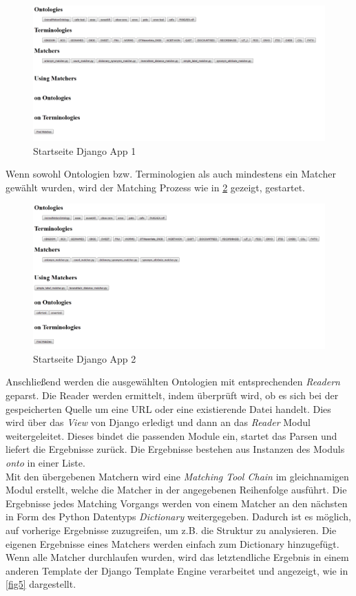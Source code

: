 		\begin{figure}[ht]
		\centering
		\includegraphics[width=1.0\textwidth]{pics/TemplateMatchingStartPage.png}
		\caption{Startseite Django App 1}
		\label{fig3}
		\end{figure}
		Wenn sowohl Ontologien bzw. Terminologien als auch mindestens ein Matcher
		gewählt wurden, wird der Matching Prozess wie in \ref{fig4} gezeigt,
		gestartet.
		
		\begin{figure}[ht]
		\centering
		\includegraphics[width=1.0\textwidth]{pics/TemplateMatchingStartPage1.png}
		\caption{Startseite Django App 2}
		\label{fig4}
		\end{figure}
		Anschließend werden die ausgewählten Ontologien mit entsprechenden
		\textit{Readern} geparst. Die Reader werden ermittelt, indem überprüft wird,
		ob es sich bei der gespeicherten Quelle um eine URL oder eine
		existierende Datei handelt. Dies wird über das \textit{View} von Django
		erledigt und dann an das \textit{Reader} Modul weitergeleitet. Dieses bindet
		die passenden Module ein, startet das Parsen und liefert die Ergebnisse
		zurück. Die Ergebnisse bestehen aus Instanzen des Moduls \textit{onto} in
		einer Liste.\\
		Mit den übergebenen Matchern wird eine \textit{Matching Tool Chain} im
		gleichnamigen Modul erstellt, welche die Matcher in der angegebenen
		Reihenfolge ausführt. Die Ergebnisse jedes Matching Vorgangs werden von einem
		Matcher an den nächsten in Form des Python Datentyps \textit{Dictionary}
		weitergegeben. Dadurch ist es möglich, auf vorherige Ergebnisse zuzugreifen,
		um z.B. die Struktur zu analysieren. Die eigenen Ergebnisse eines Matchers
		werden einfach zum Dictionary hinzugefügt.\\
		Wenn alle Matcher durchlaufen wurden, wird das letztendliche Ergebnis in einem
		anderen Template der Django Template Engine verarbeitet und angezeigt, wie in
		\ref{fig5} dargestellt.
				
